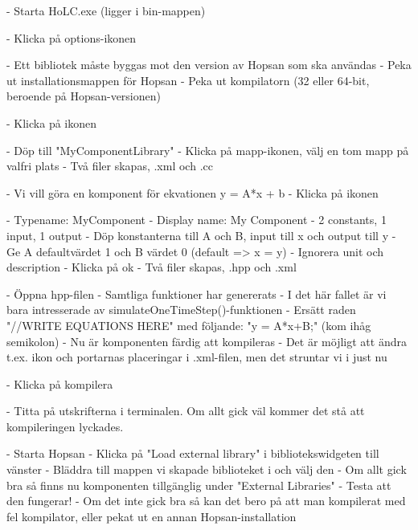 \documentclass[a4paper,pdftex]{article}
\begin{document}
\begin{enumerate}
- Starta HoLC.exe (ligger i bin-mappen)

- Klicka på options-ikonen


- Ett bibliotek måste byggas mot den version av Hopsan som ska användas
- Peka ut installationsmappen för Hopsan
- Peka ut kompilatorn (32 eller 64-bit, beroende på Hopsan-versionen)

- Klicka på ikonen


- Döp till "MyComponentLibrary"
- Klicka på mapp-ikonen, välj en tom mapp på valfri plats
- Två filer skapas, .xml och .cc

- Vi vill göra en komponent för ekvationen y = A*x + b
- Klicka på ikonen


- Typename: MyComponent
- Display name: My Component
- 2 constants, 1 input, 1 output
- Döp konstanterna till A och B, input till x och output till y
- Ge A defaultvärdet 1 och B värdet 0 (default => x = y)
- Ignorera unit och description 
- Klicka på ok
- Två filer skapas, .hpp och .xml

- Öppna hpp-filen
- Samtliga funktioner har genererats
- I det här fallet är vi bara intresserade av simulateOneTimeStep()-funktionen
- Ersätt raden "//WRITE EQUATIONS HERE" med följande: "y = A*x+B;" (kom ihåg semikolon)
- Nu är komponenten färdig att kompileras
- Det är möjligt att ändra t.ex. ikon och portarnas placeringar i .xml-filen, men det struntar vi i just nu

- Klicka på kompilera


- Titta på utskrifterna i terminalen. Om allt gick väl kommer det stå att kompileringen lyckades.

- Starta Hopsan
- Klicka på "Load external library" i bibliotekswidgeten till vänster
- Bläddra till mappen vi skapade biblioteket i och välj den
- Om allt gick bra så finns nu komponenten tillgänglig under "External Libraries"
- Testa att den fungerar!
- Om det inte gick bra så kan det bero på att man kompilerat med fel kompilator, eller pekat ut en annan Hopsan-installation

\end{enumerate}
 	
\end{document}
